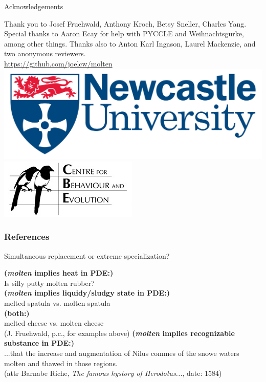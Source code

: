 \documentclass[hyperref={pdfpagelabels=false}]{beamer}
\begin{document}
\begin{frame}{Acknowledgements}
\begin{center}
Thank you to Josef Fruehwald, Anthony Kroch, Betsy Sneller, Charles Yang. Special thanks to Aaron Ecay for help with PYCCLE and Weihnachtsgurke, among other things. Thanks also to Anton Karl Ingason, Laurel Mackenzie, and two anonymous reviewers.
\vspace{5mm}\\
\url{https://github.com/joelcw/molten}\\\vspace{3mm}
\includegraphics[scale = 0.1]{ncllogo.jpg} \includegraphics[scale = 0.4]{CBElogo.jpg} 
\end{center}
\end{frame}


\begin{frame}[allowframebreaks]
\frametitle{References}
\newcommand*{\newblock}{natbib}


\end{frame}


\begin{frame}{Simultaneous replacement or extreme specialization?}
		\begin{exe}
			\ex \textbf{(\textsl{molten} implies heat in PDE:)}\\
			Is silly putty molten rubber?\\
			\ex \textbf{(\textsl{molten} implies liquidy/sludgy state in PDE:)}\\
			melted spatula vs. molten spatula\\
			\ex \textbf{(both:)}\\
			melted cheese vs. molten cheese\\
			(J. Fruehwald, p.c., for examples above)
			\ex \textbf{(\textsl{molten} implies recognizable substance in PDE:)}\\
			...that the increase and augmentation of Nilus commes of the snowe waters molten and thawed in those regions.\\
			(attr Barnabe Riche, \textsl{The famous hystory of Herodotus...}, date: 1584)
		\end{exe}
		
\end{frame}
\end{document}
